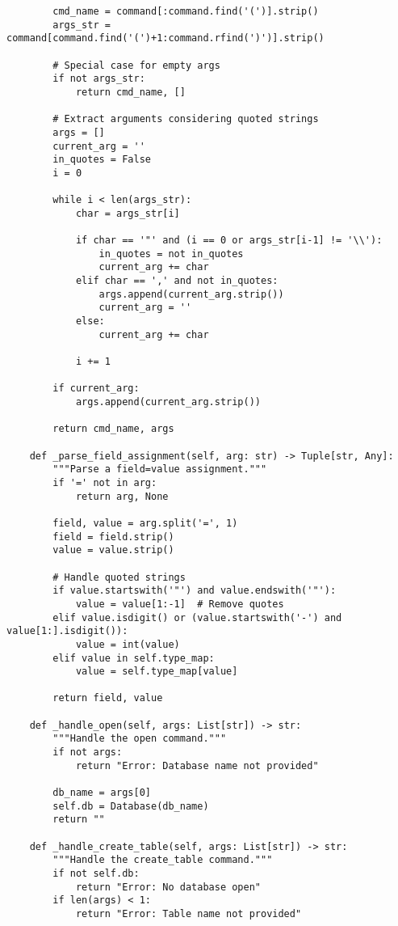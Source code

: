 \documentclass[utf8]{article}
\begin{document}
\begin{verbatim}
        cmd_name = command[:command.find('(')].strip()
        args_str = command[command.find('(')+1:command.rfind(')')].strip()
        
        # Special case for empty args
        if not args_str:
            return cmd_name, []
        
        # Extract arguments considering quoted strings
        args = []
        current_arg = ''
        in_quotes = False
        i = 0
        
        while i < len(args_str):
            char = args_str[i]
            
            if char == '"' and (i == 0 or args_str[i-1] != '\\'):
                in_quotes = not in_quotes
                current_arg += char
            elif char == ',' and not in_quotes:
                args.append(current_arg.strip())
                current_arg = ''
            else:
                current_arg += char
            
            i += 1
        
        if current_arg:
            args.append(current_arg.strip())
        
        return cmd_name, args
    
    def _parse_field_assignment(self, arg: str) -> Tuple[str, Any]:
        """Parse a field=value assignment."""
        if '=' not in arg:
            return arg, None
        
        field, value = arg.split('=', 1)
        field = field.strip()
        value = value.strip()
        
        # Handle quoted strings
        if value.startswith('"') and value.endswith('"'):
            value = value[1:-1]  # Remove quotes
        elif value.isdigit() or (value.startswith('-') and value[1:].isdigit()):
            value = int(value)
        elif value in self.type_map:
            value = self.type_map[value]
        
        return field, value
    
    def _handle_open(self, args: List[str]) -> str:
        """Handle the open command."""
        if not args:
            return "Error: Database name not provided"
        
        db_name = args[0]
        self.db = Database(db_name)
        return ""
    
    def _handle_create_table(self, args: List[str]) -> str:
        """Handle the create_table command."""
        if not self.db:
            return "Error: No database open"
        if len(args) < 1:
            return "Error: Table name not provided"
        

\end{verbatim}
\end{document}
